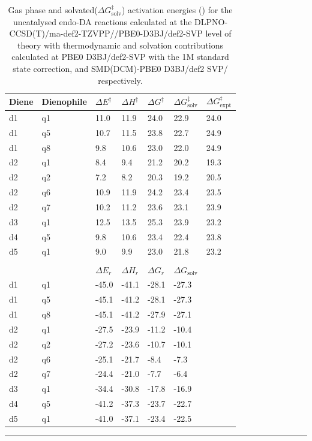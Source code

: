 \documentclass[../../main.tex]{subfiles}
\begin{document}
\begin{table}[h!]
	\def\arraystretch{1.7}
	\begin{tabularx}{\textwidth}{YYYYYYY}
		\hline
		Diene	&Dienophile	&$\Delta E^\ddagger$ &$\Delta H^\ddagger$&	$\Delta G^\ddagger$	&$\Delta G^\ddagger_\text{solv}$&	$\Delta G^\ddagger_\text{expt}$ \\
		\hline
		d1	&q1	&11.0&11.9	&24.0&22.9&	24.0
\\
		d1&	q5	&10.7	&11.5&	23.8	&22.7&	24.9
\\
		d1	&q8&9.8	&10.6&	23.0&	22.0&	24.9
\\
		d2&	q1	&8.4&	9.4	&21.2&	20.2&	19.3
\\
		d2	&q2	&7.2	&8.2&	20.3&	19.2&	20.5
\\
		d2	&q6	&10.9&	11.9&	24.2&	23.4&	23.5
\\
		d2	&q7	&10.2&	11.2	&23.6&	23.1&	23.9
\\
		d3&	q1	&12.5	&13.5&	25.3&	23.9&	23.2
\\
		d4&	q5&	9.8	   &10.6&	23.4&	22.4&	23.8
\\
		d5&	q1	&9.0&	9.9	&23.0	&21.8& 	23.2
\\
		&&&&&&\\
		\hline
		&&$\Delta E_r$ &$\Delta H_r$&	$\Delta G_r$	&$\Delta G_\text{solv}$&\\
		\hline
		d1	&q1	&-45.0	&-41.1&	-28.1&	-27.3&
\\
		d1	&q5&	-45.1	&-41.2&	-28.1&	-27.3&
\\
		d1	&q8&	-45.1&	-41.2&	-27.9&	-27.1&\\
		d2&	q1	&-27.5&	-23.9&	-11.2&	-10.4&
\\
		d2	&q2	&-27.2&	-23.6&	-10.7&	-10.1
&\\
		d2	&q6	&-25.1&	-21.7&	-8.4&	-7.3&
\\
		d2	&q7	&-24.4&	-21.0&	-7.7&	-6.4
&\\
		d3&	q1	&-34.4&	-30.8	&-17.8	&-16.9
&\\
		d4&	q5	&-41.2&	-37.3&	-23.7&	-22.7&
\\
		d5	&q1	&-41.0&	-37.1&	-23.4&	-22.5&
\\
	\end{tabularx}
	\hrule
	\vspace{0.2cm}
	\caption{Gas phase and solvated($\Delta G^\ddagger_\text{solv}$) activation energies (\kcal) for the uncatalysed endo-DA reactions calculated at the DLPNO-CCSD(T)/ma-def2-TZVPP//PBE0-D3BJ/def2-SVP level of theory with thermodynamic and solvation contributions calculated at PBE0 D3BJ/def2-SVP with the 1M standard state correction, and SMD(DCM)-PBE0 D3BJ/def2 SVP/ respectively.}
	\label{table::si_da_11_12}
\end{table}
\end{document}
